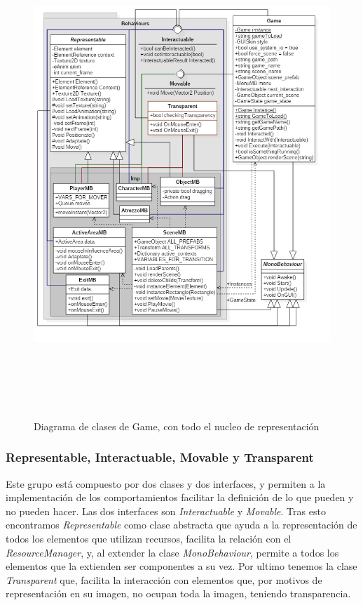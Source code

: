 \begin{figure}[h!]
	\centerline{\includegraphics[height=7.2in]{figures/it2/Game.png}}
	\caption[Game - Versión Final]{Diagrama de clases de Game, con todo el nucleo de representación}
	\label{gameit2}
\end{figure}

\subsubsection{Representable, Interactuable, Movable y Transparent}

Este grupo está compuesto por dos clases y dos interfaces, y permiten a la implementación de los comportamientos facilitar la definición de lo que pueden y no pueden hacer. Las dos interfaces son \textit{Interactuable} y \textit{Movable}. Tras esto encontramos \textit{Representable} como clase abstracta que ayuda a la representación de todos los elementos que utilizan recursos, facilita la relación con el \textit{ResourceManager}, y, al extender la clase \textit{MonoBehaviour}, permite a todos los elementos que la extienden ser componentes a su vez. Por ultimo tenemos la clase \textit{Transparent} que, facilita la interacción con elementos que, por motivos de representación en su imagen, no ocupan toda la imagen, teniendo transparencia.

